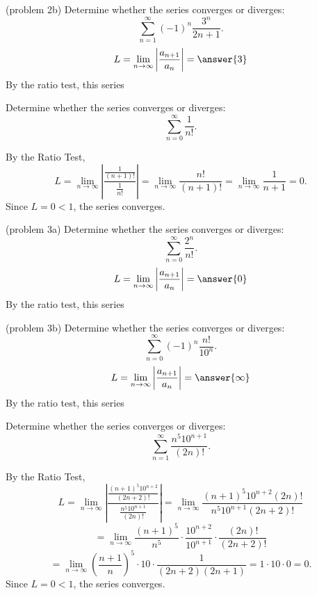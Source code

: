 \documentclass[handout]{ximera}
\begin{document}
\begin{problem}(problem 2b)
Determine whether the series converges or diverges:
\[
\sum_{n=1}^\infty (-1)^n\frac{3^n}{2n+1}.
\]
\[
L = \lim_{n \to \infty} \left|\frac{a_{n+1}}{a_n}\right| = \answer{3}
\]
By the ratio test, this series 

\end{problem}



\begin{example}[example 3]
Determine whether the series converges or diverges:
\[
\sum_{n=0}^\infty \frac{1}{n!}.
\]

By the Ratio Test,
\[
L =  \lim_{n \to \infty} \left|\frac{\frac{1}{(n+1)!}}{\frac{1}{n!}}\right| =  \lim_{n \to \infty} \frac{n!}{(n+1)!} =  \lim_{n \to \infty} \frac{1}{n+1} = 0.
\]
Since $L = 0 < 1$, the series converges.
\end{example}



\begin{problem}(problem 3a)
Determine whether the series converges or diverges:
\[
\sum_{n=0}^\infty \frac{2^n}{n!}.
\]
\[
L = \lim_{n \to \infty} \left|\frac{a_{n+1}}{a_n}\right| = \answer{0}
\]
By the ratio test, this series 

\end{problem}



\begin{problem}(problem 3b)
Determine whether the series converges or diverges:
\[
\sum_{n=0}^\infty (-1)^n\frac{n!}{10^n}.
\]
\[
L = \lim_{n \to \infty} \left|\frac{a_{n+1}}{a_n}\right| = \answer{\infty}
\]
By the ratio test, this series 

\end{problem}

\begin{example}[example 4]
Determine whether the series converges or diverges:
\[
\sum_{n=1}^\infty \frac{n^5 10^{n+1}}{(2n)!}.
\]

By the Ratio Test,
\[
L =  \lim_{n \to \infty} \left|\frac{\frac{(n+1)^5 10^{n+2}}{(2n+2)!}}{\frac{n^5 10^{n+1}}{(2n)!}}\right| 
=  \lim_{n \to \infty} \frac{(n+1)^5 10^{n+2}(2n)!}{n^5 10^{n+1}(2n+2)!}
\]
\[
 =  \lim_{n \to \infty} \frac{(n+1)^5}{n^5} \cdot \frac{10^{n+2}}{10^{n+1}} \cdot \frac{(2n)!}{(2n+2)!} 
 \]
 \[
 = 
  \lim_{n \to \infty} \left(\frac{n+1}{n}\right)^5 \cdot 10 \cdot \frac{1}{(2n+2)(2n+1)} = 1 \cdot 10 \cdot 0 = 0.
\]
Since $L = 0 < 1$, the series converges.
\end{example}
\end{document}
